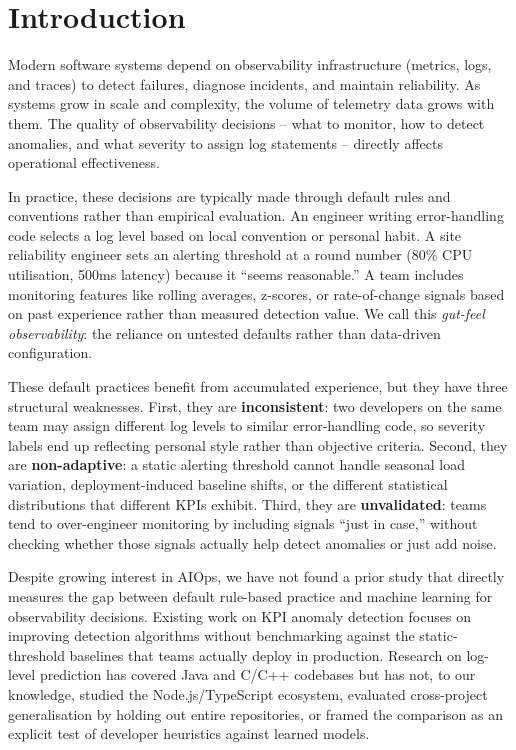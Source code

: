 \documentclass[10pt,twocolumn]{article}
\begin{document}
\section{Introduction}
\label{sec:intro}

Modern software systems depend on observability infrastructure (metrics, logs, and traces) to detect failures, diagnose incidents, and maintain reliability. As systems grow in scale and complexity, the volume of telemetry data grows with them. The quality of observability decisions -- what to monitor, how to detect anomalies, and what severity to assign log statements -- directly affects operational effectiveness.

In practice, these decisions are typically made through default rules and conventions rather than empirical evaluation. An engineer writing error-handling code selects a log level based on local convention or personal habit. A site reliability engineer sets an alerting threshold at a round number (80\% CPU utilisation, 500ms latency) because it ``seems reasonable.'' A team includes monitoring features like rolling averages, z-scores, or rate-of-change signals based on past experience rather than measured detection value. We call this \emph{gut-feel observability}: the reliance on untested defaults rather than data-driven configuration.

These default practices benefit from accumulated experience, but they have three structural weaknesses. First, they are \textbf{inconsistent}: two developers on the same team may assign different log levels to similar error-handling code, so severity labels end up reflecting personal style rather than objective criteria. Second, they are \textbf{non-adaptive}: a static alerting threshold cannot handle seasonal load variation, deployment-induced baseline shifts, or the different statistical distributions that different KPIs exhibit. Third, they are \textbf{unvalidated}: teams tend to over-engineer monitoring by including signals ``just in case,'' without checking whether those signals actually help detect anomalies or just add noise.

Despite growing interest in AIOps, we have not found a prior study that directly measures the gap between default rule-based practice and machine learning for observability decisions. Existing work on KPI anomaly detection focuses on improving detection algorithms without benchmarking against the static-threshold baselines that teams actually deploy in production. Research on log-level prediction has covered Java and C/C++ codebases but has not, to our knowledge, studied the Node.js/TypeScript ecosystem, evaluated cross-project generalisation by holding out entire repositories, or framed the comparison as an explicit test of developer heuristics against learned models.
\end{document}
